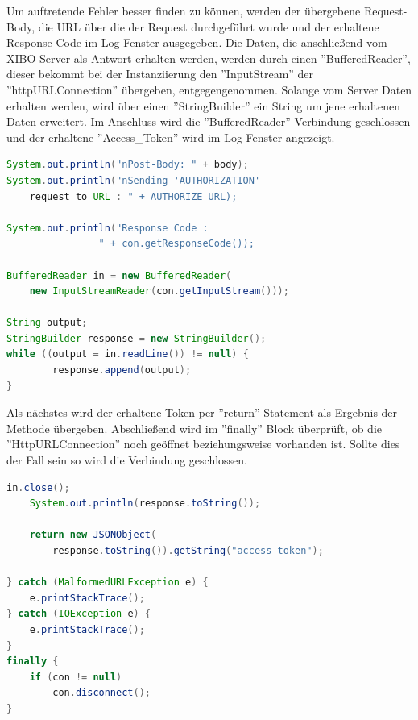 Um auftretende Fehler besser finden zu können, werden der übergebene Request-Body, die URL über die der Request durchgeführt wurde und der erhaltene Response-Code im Log-Fenster ausgegeben. Die Daten, die anschließend vom XIBO-Server als Antwort erhalten werden, werden durch einen ''BufferedReader'', dieser bekommt bei der Instanziierung den ''InputStream'' der ''httpURLConnection'' übergeben, entgegengenommen. Solange vom Server Daten erhalten werden, wird über einen ''StringBuilder'' ein String um jene erhaltenen Daten erweitert. Im Anschluss wird die ''BufferedReader'' Verbindung geschlossen und der erhaltene ''Access\_Token'' wird im Log-Fenster angezeigt.

\begin{lstlisting}[language=Java,caption={Erhalt der Daten vom Server}]
System.out.println("nPost-Body: " + body);
System.out.println("nSending 'AUTHORIZATION'
    request to URL : " + AUTHORIZE_URL);
             
System.out.println("Response Code :
				" + con.getResponseCode());

BufferedReader in = new BufferedReader(
    new InputStreamReader(con.getInputStream()));
    
String output;
StringBuilder response = new StringBuilder();
while ((output = in.readLine()) != null) {
        response.append(output);
}
\end{lstlisting}

Als nächstes wird der erhaltene Token per ''return'' Statement als Ergebnis der Methode übergeben. Abschließend wird im ''finally'' Block überprüft, ob die ''HttpURLConnection'' noch geöffnet beziehungsweise vorhanden ist. Sollte dies der Fall sein so wird die Verbindung geschlossen.
\begin{lstlisting}[language=Java,caption={Rückgabe des Token und schließen der Verbindung}]
	in.close();
	System.out.println(response.toString());

	return new JSONObject(
     	response.toString()).getString("access_token");
     	
} catch (MalformedURLException e) {
	e.printStackTrace();
} catch (IOException e) {
    e.printStackTrace();
}
finally {
	if (con != null)
    	con.disconnect();
}
\end{lstlisting}




